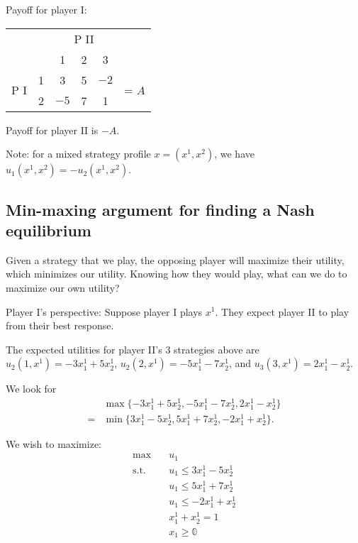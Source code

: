\documentclass[12pt,letterpaper]{report}
\begin{document}
\begin{ex}
  Payoff for player I:
  \begin{center}
    \renewcommand{\arraystretch}{1.25}
    \begin{tabular}{c c |c|c|c|c}
      \multicolumn{2}{c}{} & \multicolumn{3}{c}{P II} & \\
      \multicolumn{2}{c}{} & \multicolumn{1}{c}{1} & \multicolumn{1}{c}{2}
        & \multicolumn{1}{c}{3} & \\
      \cline{3-5}
      \multirow{2}{*}{P I} & 1 & 3 & 5 & $-2$ & \multirow{2}{*}{= $A$} \\
      \cline{3-5}
      & 2 & $-5$ & 7 & 1 & \\
      \cline{3-5}
    \end{tabular}
  \end{center}
  Payoff for player II is $-A$.
\end{ex}

Note: for a mixed strategy profile $x = (x^1, x^2)$, we have $u_1(x^1, x^2) = -u_2(x^1, x^2)$.

\subsection{Min-maxing argument for finding a Nash equilibrium}

Given a strategy that we play, the opposing player will maximize their utility, which minimizes our
utility.
Knowing how they would play, what can we do to maximize our own utility?

Player I's perspective: Suppose player I plays $x^1$.
They expect player II to play from their best response.

\begin{ex}
  The expected utilities for player II's 3 strategies above are $u_2(1, x^1) = -3x_1^1 + 5x_2^1$,
  $u_2(2, x^1) = -5x_1^1 - 7x_2^1$, and $u_3(3, x^1) = 2x_1^1 - x_2^1$.

  We look for
  \begin{align*}
    & \max \{ -3x_1^1 + 5x_2^1, -5x_1^1 - 7x_2^1, 2x_1^1 - x_2^1 \} \\
    =& \min \{ 3x_1^1 - 5x_2^1, 5x_1^1 + 7x_2^1, -2x_1^1 + x_2^1 \}.
  \end{align*}

  We wish to maximize:
  \begin{align*}
    \max \quad & u_1 \\
    \text{s.t.} \quad & u_1 \leq 3x_1^1 - 5x_2^1 \\
    & u_1 \leq 5x_1^1 + 7x_2^1 \\
    & u_1 \leq -2x_1^1 + x_2^1 \\
    & x_1^1 + x_2^1 = 1 \\
    & x_1 \geq \mathbb{0}
  \end{align*}
\end{ex}
\end{document}
